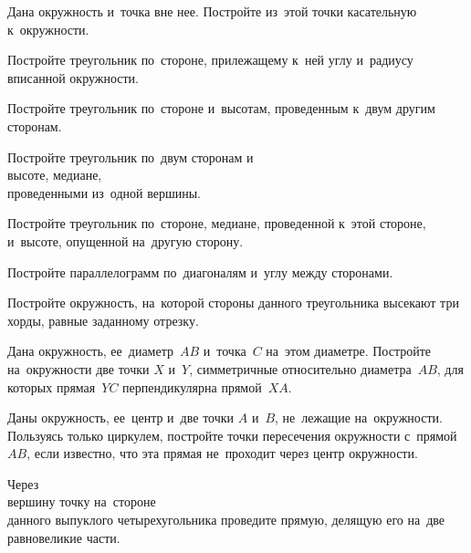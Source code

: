 \begin{problems}

\item
Дана окружность и~точка вне нее.
Постройте из~этой точки касательную к~окружности.


\item
Постройте треугольник по~стороне, прилежащему к~ней углу и~радиусу вписанной
окружности.

\item
Постройте треугольник по~стороне и~высотам, проведенным к~двум другим сторонам.

\item
Постройте треугольник по~двум сторонам и
\\
\subproblem высоте,
\quad
\subproblem медиане,
\\
проведенными из~одной вершины.


\item
Постройте треугольник по~стороне, медиане, проведенной к~этой стороне,
и~высоте, опущенной на~другую сторону.

\item
Постройте параллелограмм по~диагоналям и~углу между сторонами.


\item
Постройте окружность, на~которой стороны данного треугольника высекают три
хорды, равные заданному отрезку.

\item
Дана окружность, ее~диаметр~$AB$ и~точка~$C$ на~этом диаметре.
Постройте на~окружности две точки $X$ и~$Y$, симметричные относительно
диаметра~$AB$, для которых прямая~$YC$ перпендикулярна прямой~$XA$.

\item
Даны окружность, ее~центр и~две точки $A$ и~$B$, не~лежащие на~окружности.
Пользуясь только циркулем, постройте точки пересечения окружности
с~прямой~$AB$, если известно, что эта прямая не~проходит через центр
окружности.

\item
Через
\\
\subproblem вершину
\quad
\subproblem точку на~стороне
\\
данного выпуклого четырехугольника проведите прямую, делящую его на~две
равновеликие части.

\end{problems}

